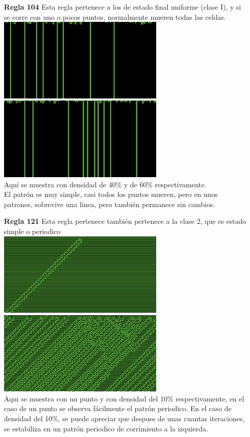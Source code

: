 \documentclass{article}
\begin{document}
\begin{enumerate}
\item[\bf{Regla 104}] Esta regla pertenece a los de estado final uniforme (clase I), y si se corre con uno o pocos puntos, normalmente mueren todas las celdas.\\

\includegraphics[width=300px]{104-40.png}\\
\includegraphics[width=300px]{104-60.png}\\

Aquí se muestra con densidad de 40\% y de 60\% respectivamente.\\
El patrón es muy simple, casi todos los puntos mueren, pero en unos patrones, sobrevive una linea, pero también permanece sin cambios.


\item[\bf{Regla 121}] Esta regla pertenece también pertenece a la clase 2, que es estado simple o periodico\\
\includegraphics[width=300px]{121-1.png}\\
\includegraphics[width=300px]{121-10.png}\\
Aqui se muestra con un punto y con densidad del 10\% respectivamente, en el caso de un punto se observa fácilmente el patrón periodico. En el caso de densidad del 10\%, se puede apreciar que despues de unas cuantas iteraciones, se estabiliza en un patrón periodico de corrimiento a la izquierda.


\end{enumerate}
\end{document}
